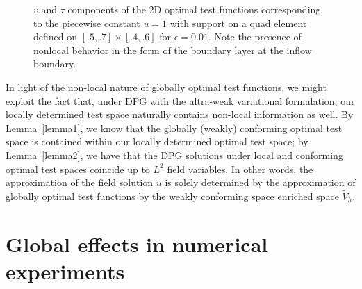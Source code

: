 \begin{figure}[!h]
\centering
{}
\caption{$v$ and $\tau$ components of the 2D optimal test functions corresponding to the piecewise constant $u=1$ with support on a quad element defined on $[.5,.7]\times[.4,.6]$ for $\epsilon = 0.01$. Note the presence of nonlocal behavior in the form of the boundary layer at the inflow boundary.}
\label{fig:optTestBoundaryGlobal}
\end{figure}

In light of the non-local nature of globally optimal test functions, we might exploit the fact that, under DPG with the ultra-weak variational formulation, our locally determined test space naturally contains non-local information as well.  By Lemma~\ref{lemma1}, we know that the globally (weakly) conforming optimal test space is contained within our locally determined optimal test space; by Lemma~\ref{lemma2}, we have that the DPG solutions under local and conforming optimal test spaces coincide up to $L^2$ field variables.  In other words, the approximation of the field solution $u$ is solely determined by the approximation of globally optimal test functions by the weakly conforming space enriched space $\tilde{V}_h$.  

\section{Global effects in numerical experiments}

